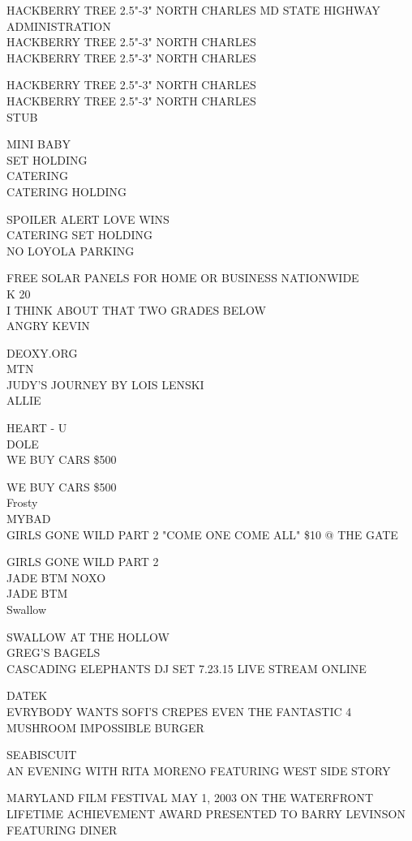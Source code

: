 \documentclass[10pt,letterpaper]{article}
\begin{document}
HACKBERRY TREE 2.5"{-}3" NORTH CHARLES MD STATE HIGHWAY ADMINISTRATION\\
HACKBERRY TREE 2.5"{-}3" NORTH CHARLES\\
HACKBERRY TREE 2.5"{-}3" NORTH CHARLES

HACKBERRY TREE 2.5"{-}3" NORTH CHARLES\\
HACKBERRY TREE 2.5"{-}3" NORTH CHARLES\\
STUB

MINI BABY\\
SET HOLDING\\
CATERING\\
CATERING HOLDING

SPOILER ALERT LOVE WINS\\
CATERING SET HOLDING\\
NO LOYOLA PARKING

FREE SOLAR PANELS FOR HOME OR BUSINESS NATIONWIDE\\
K 20\\
I THINK ABOUT THAT TWO GRADES BELOW\\
ANGRY KEVIN

DEOXY.ORG\\
MTN\\
JUDY'S JOURNEY BY LOIS LENSKI\\
ALLIE

HEART {-} U\\
DOLE\\
WE BUY CARS \$500

WE BUY CARS \$500\\
Frosty\\
MYBAD\\
GIRLS GONE WILD PART 2 "COME ONE COME ALL" \$10 @ THE GATE

GIRLS GONE WILD PART 2\\
JADE BTM NOXO\\
JADE BTM\\
Swallow

SWALLOW AT THE HOLLOW\\
GREG'S BAGELS\\
CASCADING ELEPHANTS DJ SET 7.23.15 LIVE STREAM ONLINE

DATEK\\
EVRYBODY WANTS SOFI'S CREPES EVEN THE FANTASTIC 4\\
MUSHROOM IMPOSSIBLE BURGER

SEABISCUIT\\
AN EVENING WITH RITA MORENO FEATURING WEST SIDE STORY

MARYLAND FILM FESTIVAL MAY 1, 2003 ON THE WATERFRONT\\
LIFETIME ACHIEVEMENT AWARD PRESENTED TO BARRY LEVINSON FEATURING DINER
\end{document}
